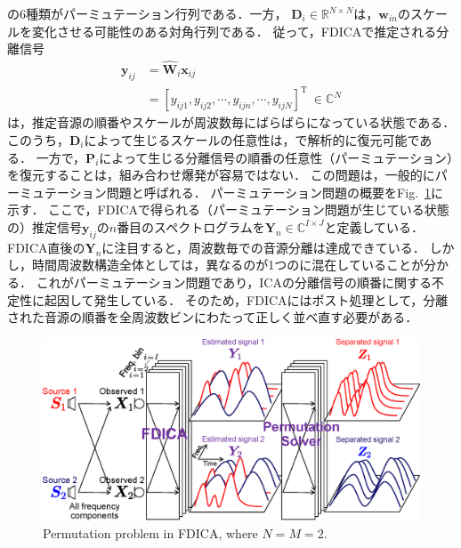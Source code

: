 の6種類がパーミュテーション行列である．一方，
$\bm{D}_i \in \mathbb{R}^{N \times N}$は，$\bm{w}_{in}$のスケールを変化させる可能性のある対角行列である．
従って，FDICAで推定される分離信号
\begin{align}
\bm{y}_{ij} &= \hat{\bm{W}}_i\bm{x}_{ij} \\
&=\left[ y_{ij1},y_{ij2}, \cdots, y_{ijn}, \cdots, y_{ijN} \right]^\mathrm{T}~\in \mathbb{C}^{N} \label{eq:sepSig}
\end{align}
は，推定音源の順番やスケールが周波数毎にばらばらになっている状態である．
このうち，$\bm{D}_i$によって生じるスケールの任意性は，\cite{Matsuoka2001_PB}で解析的に復元可能である．
一方で，$\bm{P}_i$によって生じる分離信号の順番の任意性（パーミュテーション）を復元することは，組み合わせ爆発が容易ではない．
この問題は，一般的にパーミュテーション問題と呼ばれる．
パーミュテーション問題の概要をFig.~\ref{fig:permu}に示す．
ここで，FDICAで得られる（パーミュテーション問題が生じている状態の）推定信号$\bm{y}_{ij}$の$n$番目のスペクトログラムを$\bm{Y}_n \in \mathbb{C}^{I \times J}$と定義している．
FDICA直後の$\bm{Y}_n$に注目すると，周波数毎での音源分離は達成できている．
しかし，時間周波数構造全体としては，異なるのが1つのに混在していることが分かる．
これがパーミュテーション問題であり，ICAの分離信号の順番に関する不定性に起因して発生している．
そのため，FDICAにはポスト処理として，分離された音源の順番を全周波数ビンにわたって正しく並べ直す必要がある．
\begin{figure}[t]
    \begin{center}
        \includegraphics[width=0.95\columnwidth]{figures/permutation_image.eps}
    \end{center}
    \vspace{-8pt}
	\caption{Permutation problem in FDICA, where $N=M=2$.}
	\label{fig:permu}
\end{figure}
